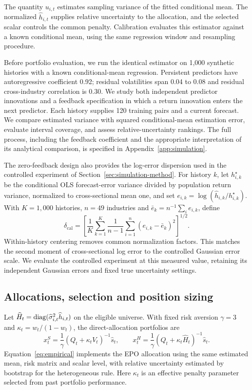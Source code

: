 The quantity $u_{i,t}$ estimates sampling variance of the fitted conditional mean. The normalized $\widehat h_{i,t}$ supplies relative uncertainty to the allocation, and the selected scalar controls the common penalty. Calibration evaluates this estimator against a known conditional mean, using the same regression window and resampling procedure.

Before portfolio evaluation, we run the identical estimator on 1,000 synthetic histories with a known conditional-mean regression. Persistent predictors have autoregressive coefficient 0.92; residual volatilities span 0.04 to 0.08 and residual cross-industry correlation is 0.30. We study both independent predictor innovations and a feedback specification in which a return innovation enters the next predictor. Each history supplies 120 training pairs and a current forecast. We compare estimated variance with squared conditional-mean estimation error, evaluate interval coverage, and assess relative-uncertainty rankings. The full process, including the feedback coefficient and the appropriate interpretation of its analytical comparison, is specified in Appendix~\ref{app:simulation}.

The zero-feedback design also provides the log-error dispersion used in the controlled experiment of Section~\ref{sec:simulation-method}. For history $k$, let $h^\star_{i,k}$ be the conditional OLS forecast-error variance divided by population return variance, normalized to cross-sectional mean one, and set $e_{i,k}=\log(\widehat h_{i,k}/h^\star_{i,k})$. With $K=1{,}000$ histories, $n=49$ industries and $\bar e_k=n^{-1}\sum_i e_{i,k}$, define
\begin{equation}
\delta_{\mathrm{cal}}=\left[\frac{1}{K}\sum_{k=1}^K\frac{1}{n-1}\sum_{i=1}^n(e_{i,k}-\bar e_k)^2\right]^{1/2}.
\label{eq:calibrated-error}
\end{equation}
Within-history centering removes common normalization factors. This matches the second moment of cross-sectional log error to the controlled Gaussian error scale. We evaluate the controlled experiment at this measured value, retaining its independent Gaussian errors and fixed true uncertainty settings.

\subsection{Allocations, selection and position sizing}
Let $\widehat H_t=\operatorname{diag}(\widehat\sigma_{i,t}^2\widehat h_{i,t})$ on the eligible universe. With fixed risk aversion $\gamma=3$ and $\kappa_t=w_t/(1-w_t)$, the direct-allocation portfolios are
\begin{equation}
x_t^S=\frac{1}{\gamma}(Q_t+\kappa_t V_t)^{-1}\widehat s_t,
\qquad
x_t^H=\frac{1}{\gamma}(Q_t+\kappa_t\widehat H_t)^{-1}\widehat s_t.
\label{eq:empirical}
\end{equation}
Equation~\eqref{eq:empirical} implements the EPO allocation using the same estimated mean, risk matrix and scalar level, with relative uncertainty estimated by bootstrap for the heterogeneous rule. Here $\kappa_t$ is an effective penalty parameter selected from past portfolio performance.

